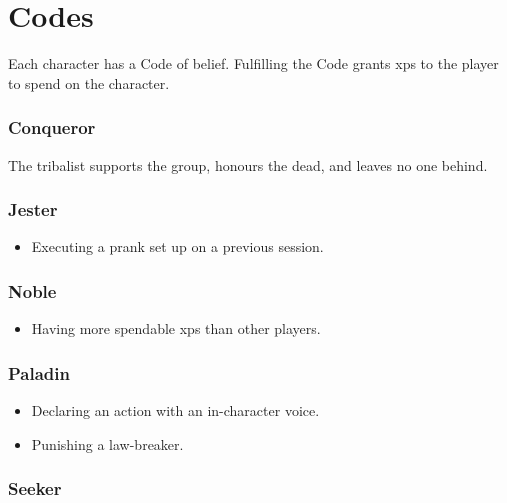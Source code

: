 \chapter{Codes}
\label{codes}

\begin{multicols}{2}
\noindent
Each character has a Code of belief.
Fulfilling the Code grants \glspl{xp} to the player to spend on the character.

\subsection{Conqueror}

The tribalist supports the group, honours the dead, and leaves no one behind.


\subsection{Jester}

\begin{itemize}

  \item
  Executing a prank set up on a previous session.

\end{itemize}

\subsection{Noble}

\begin{itemize}

  \item
  Having more spendable \glspl{xp} than other players.

\end{itemize}

\subsection{Paladin}

\begin{itemize}

  \item
  Declaring an action with an in-character voice.
  \item
  Punishing a law-breaker.

\end{itemize}

\subsection{Seeker}


\end{multicols}
